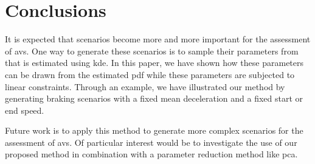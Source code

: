 \section{Conclusions}
\label{sec:conclusions}

It is expected that scenarios become more and more important for the assessment of \acp{av}. 
One way to generate these scenarios is to sample their parameters from  that is estimated using \ac{kde}. 
In this paper, we have shown how these parameters can be drawn from the estimated \ac{pdf} while these parameters are subjected to linear constraints. 
Through an example, we have illustrated our method by generating braking scenarios with a fixed mean deceleration and a fixed start or end speed. 

Future work is to apply this method to generate more complex scenarios for the assessment of \acp{av}.
Of particular interest would be to investigate the use of our proposed method in combination with a parameter reduction method like \ac{pca}. 
